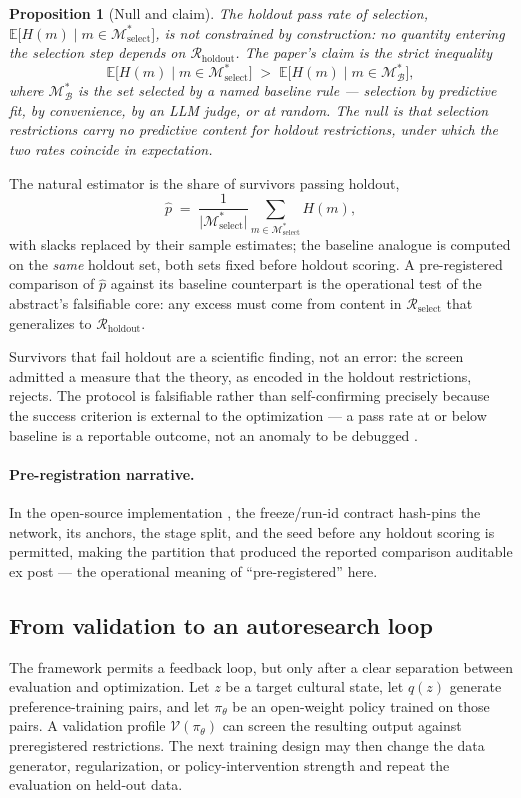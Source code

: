 \documentclass[10pt,letterpaper]{article}
\newtheorem{proposition}{Proposition}[section]
\newcommand{\M}{\ensuremath{\mathcal{M}}}
\newcommand{\E}{\mathbb{E}}
\begin{document}
\begin{proposition}[Null and claim]
The holdout pass rate of selection, $\E\bigl[H(m) \mid m \in \M^*_{\mathrm{select}}\bigr]$, is not constrained by construction: no quantity entering the selection step depends on $\mathcal{R}_{\mathrm{holdout}}$. The paper's claim is the strict inequality
\[
\E\bigl[H(m) \mid m \in \M^*_{\mathrm{select}}\bigr] \;>\; \E\bigl[H(m) \mid m \in \M^*_{\mathcal{B}}\bigr],
\]
where $\M^*_{\mathcal{B}}$ is the set selected by a named baseline rule --- selection by predictive fit, by convenience, by an LLM judge, or at random. The null is that selection restrictions carry no predictive content for holdout restrictions, under which the two rates coincide in expectation.
\end{proposition}

The natural estimator is the share of survivors passing holdout,
\[
\hat p \;=\; \frac{1}{\lvert \M^*_{\mathrm{select}} \rvert} \sum_{m \in \M^*_{\mathrm{select}}} H(m),
\]
with slacks replaced by their sample estimates; the baseline analogue is computed on the \emph{same} holdout set, both sets fixed before holdout scoring. A pre-registered comparison of $\hat p$ against its baseline counterpart is the operational test of the abstract's falsifiable core: any excess must come from content in $\mathcal{R}_{\mathrm{select}}$ that generalizes to $\mathcal{R}_{\mathrm{holdout}}$.

Survivors that fail holdout are a scientific finding, not an error: the screen admitted a measure that the theory, as encoded in the holdout restrictions, rejects. The protocol is falsifiable rather than self-confirming precisely because the success criterion is external to the optimization --- a pass rate at or below baseline is a reportable outcome, not an anomaly to be debugged \cite{dellrambachan2026,manski2003}.

\paragraph{Pre-registration narrative.}
In the open-source implementation \cite{cvprofiles}, the freeze/run-id contract hash-pins the network, its anchors, the stage split, and the seed before any holdout scoring is permitted, making the partition that produced the reported comparison auditable ex post --- the operational meaning of ``pre-registered'' here.

\subsection{From validation to an autoresearch loop}
The framework permits a feedback loop, but only after a clear separation between evaluation and optimization. Let $z$ be a target cultural state, let $q(z)$ generate preference-training pairs, and let $\pi_\theta$ be an open-weight policy trained on those pairs. A validation profile $\mathcal{V}(\pi_\theta)$ can screen the resulting output against preregistered restrictions. The next training design may then change the data generator, regularization, or policy-intervention strength and repeat the evaluation on held-out data.
\end{document}
